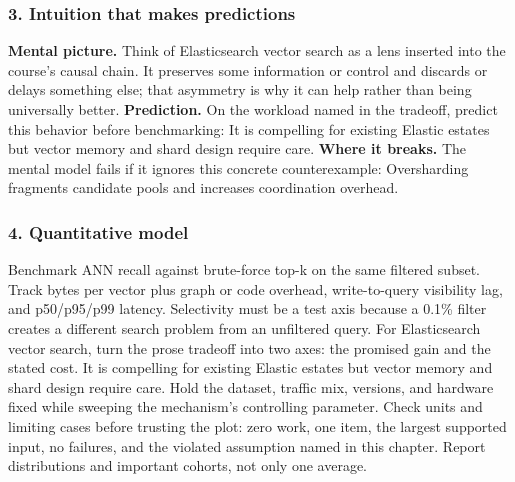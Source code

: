 \subsubsection*{3. Intuition that makes predictions}
\textbf{Mental picture.} Think of Elasticsearch vector search as a lens inserted into the course's causal chain. It preserves some information or control and discards or delays something else; that asymmetry is why it can help rather than being universally better.
\textbf{Prediction.} On the workload named in the tradeoff, predict this behavior before benchmarking: It is compelling for existing Elastic estates but vector memory and shard design require care.
\textbf{Where it breaks.} The mental model fails if it ignores this concrete counterexample: Oversharding fragments candidate pools and increases coordination overhead.
\subsubsection*{4. Quantitative model}
Benchmark ANN recall against brute-force top-k on the same filtered subset. Track bytes per vector plus graph or code overhead, write-to-query visibility lag, and p50/p95/p99 latency. Selectivity must be a test axis because a 0.1\% filter creates a different search problem from an unfiltered query.
For Elasticsearch vector search, turn the prose tradeoff into two axes: the promised gain and the stated cost. It is compelling for existing Elastic estates but vector memory and shard design require care. Hold the dataset, traffic mix, versions, and hardware fixed while sweeping the mechanism's controlling parameter.
Check units and limiting cases before trusting the plot: zero work, one item, the largest supported input, no failures, and the violated assumption named in this chapter. Report distributions and important cohorts, not only one average.
